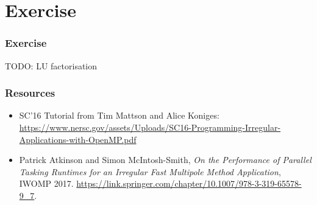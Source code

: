 \documentclass{beamer}
\begin{document}
\section{Exercise}
\begin{frame}
\frametitle{Exercise}
TODO: LU factorisation
\end{frame}

\begin{frame}
\frametitle{Resources}
\begin{itemize}
  \item SC'16 Tutorial from Tim Mattson and Alice Koniges: \url{https://www.nersc.gov/assets/Uploads/SC16-Programming-Irregular-Applications-with-OpenMP.pdf}
  \item Patrick Atkinson and Simon McIntosh-Smith, \emph{On the Performance of Parallel Tasking Runtimes for an Irregular Fast Multipole Method Application}, IWOMP 2017. \url{https://link.springer.com/chapter/10.1007/978-3-319-65578-9_7}.
\end{itemize}
\end{frame}
\end{document}
